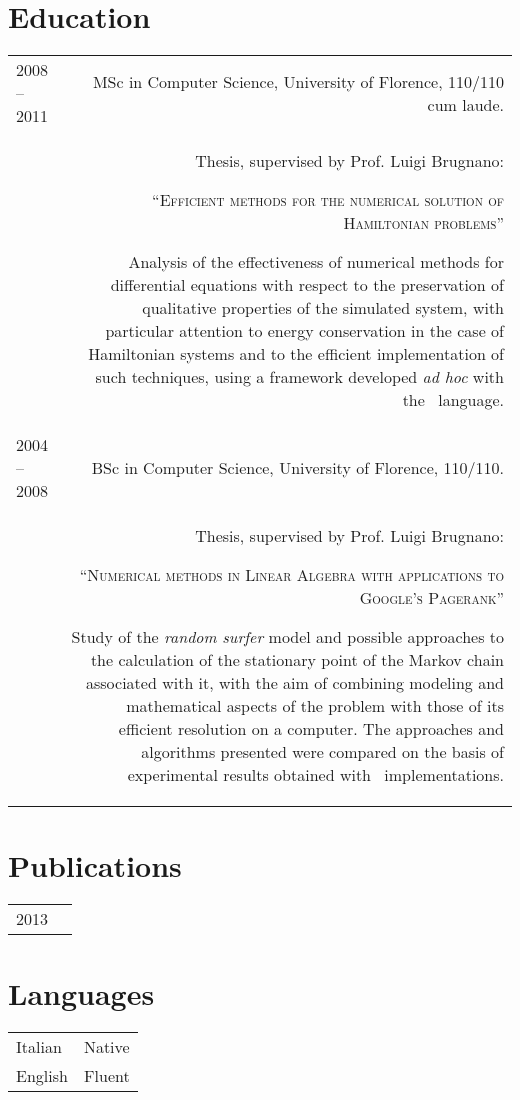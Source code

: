 \documentclass[10pt]{article}
\begin{document}
\section*{Education}
\begin{longtable}{L!{\VRule}R}
2008 -- 2011 & MSc in Computer Science, University of Florence, 110/110 cum laude.\\[5pt]
    & Thesis, supervised by Prof. Luigi Brugnano:
	\begin{center}``\textsc{Efficient methods for the numerical solution of Hamiltonian problems}''\end{center}
	Analysis of the effectiveness of numerical methods for differential equations with respect to the preservation
	of qualitative properties of the simulated system, with particular attention to energy conservation in the case
	of Hamiltonian systems and to the efficient implementation of such techniques, using a framework developed \emph{ad hoc}
	with the \clang\ language.\\[5pt]
2004 -- 2008 & BSc in Computer Science, University of Florence, 110/110.\\[5pt]
    & Thesis, supervised by Prof. Luigi Brugnano:
    \begin{center}``\textsc{Numerical methods in Linear Algebra with applications to Google's Pagerank}''\end{center}
	Study of the \emph{random surfer} model and possible approaches to the calculation of the stationary point of the Markov
	chain associated with it, with the aim of combining modeling and mathematical aspects of the problem with those of its efficient
	resolution on a computer. The approaches and algorithms presented were compared on the basis of experimental results obtained
	with \matlab\ implementations.
\end{longtable}



\section*{Publications}
\begin{longtable}{L!{\VRule}R}
2013 & 
\end{longtable}

\section*{Languages}
\begin{tabular}{L!{\VRule}R}
Italian & Native\\[5pt]
English & Fluent
\end{tabular}

\vspace{2em}
\end{document}
